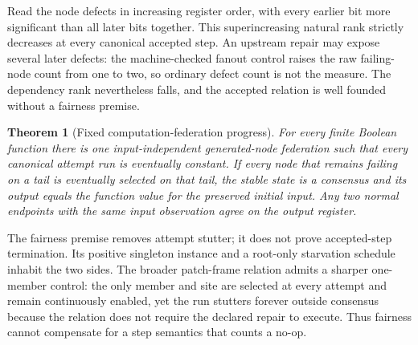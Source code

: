 \documentclass[11pt]{article}
\newtheorem{theorem}{Theorem}[section]
\theoremstyle{definition}
\theoremstyle{remark}
\numberwithin{equation}{section}
\begin{document}
Read the node defects in increasing register order, with every earlier bit
more significant than all later bits together.  This superincreasing natural
rank strictly decreases at every canonical accepted step.  An upstream repair
may expose several later defects: the machine-checked fanout control raises
the raw failing-node count from one to two, so ordinary defect count is not the
measure.  The dependency rank nevertheless falls, and the accepted relation
is well founded without a fairness premise.

\begin{theorem}[Fixed computation-federation progress]
\label{thm:fixed-computation-federation}
For every finite Boolean function there is one input-independent generated-node
federation such that every canonical attempt run is eventually constant.  If
every node that remains failing on a tail is eventually selected on that tail,
the stable state is a consensus and its output equals the function value for
the preserved initial input.  Any two normal endpoints with the same input
observation agree on the output register.
\end{theorem}

The fairness premise removes attempt stutter; it does not prove accepted-step
termination.  Its positive singleton instance and a root-only starvation
schedule inhabit the two sides.  The broader patch-frame relation admits a
sharper one-member control: the only member and site are selected at every
attempt and remain continuously enabled, yet the run stutters forever outside
consensus because the relation does not require the declared repair to execute.
Thus fairness cannot compensate for a step semantics that counts a no-op.
\end{document}
